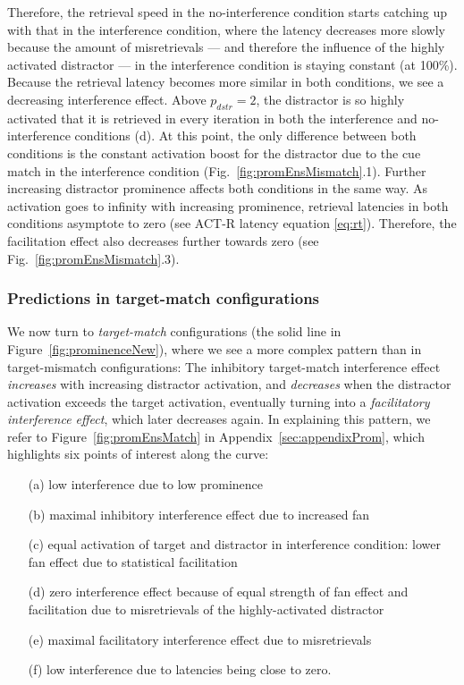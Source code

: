 \documentclass{cambridge7A}\usepackage[]{graphicx}\usepackage[]{color}
\begin{document}
Therefore, the retrieval speed in the no-interference condition starts catching up with that in the interference condition, where the latency decreases more slowly because the amount of misretrievals --- and therefore the influence of the highly activated distractor --- in the interference condition is staying constant (at 100\%).
Because the retrieval latency becomes more similar in both conditions, we see a decreasing interference effect.
Above $p_{dstr}=2$, the distractor is so highly activated that it is retrieved in every iteration in both the interference and no-interference conditions (d). At this point, the only difference between both conditions is the constant activation boost for the distractor due to the cue match in the interference condition (Fig.~\ref{fig:promEnsMismatch}.1). Further increasing distractor prominence affects both conditions in the same way.
As activation goes to infinity with increasing prominence, retrieval latencies in both conditions asymptote to zero (see ACT-R latency equation \ref{eq:rt}). Therefore, the facilitation effect also decreases further towards zero (see Fig.~\ref{fig:promEnsMismatch}.3).

\subsubsection{Predictions in target-match configurations}
We now turn to  \emph{target-match} configurations (the solid line in Figure~\ref{fig:prominenceNew}), where we see a more complex pattern than in target-mismatch configurations:
The inhibitory target-match interference effect \emph{increases} with increasing distractor activation, and \emph{decreases} when the distractor activation exceeds the target activation, eventually turning into a  \emph{facilitatory interference effect}, which later decreases again.
In explaining this pattern, we refer to Figure~\ref{fig:promEnsMatch} in Appendix~\ref{sec:appendixProm}, which highlights six points of interest along the curve:

\begin{enumerate}
 		\item[(a)] low interference due to low prominence
 		\item[(b)] maximal inhibitory interference effect due to increased fan
 		\item[(c)] equal activation of target and distractor in interference condition: lower fan effect due to statistical facilitation
 		\item[(d)] zero interference effect because of equal strength of fan effect and facilitation due to misretrievals of the highly-activated distractor
 		\item[(e)] maximal facilitatory interference effect due to misretrievals
 		\item[(f)] low interference due to latencies being close to zero.
\end{enumerate}
\end{document}
